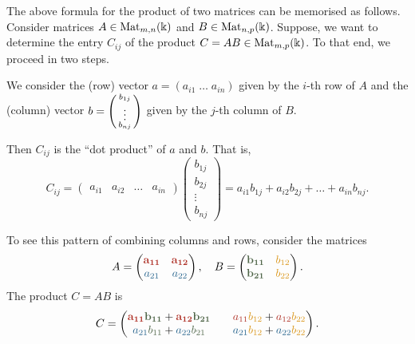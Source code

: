 \documentclass[a4paper, oneside, 12pt]{amsart}
\begin{document}
The above formula for the product of two matrices can be memorised as follows.
Consider matrices \(A\in \operatorname{Mat}_{m,n}(\Bbbk)\) and \(B \in \operatorname{Mat}_{n,p}( \Bbbk)\).
Suppose, we want to determine the entry \(C_{ij}\) of the product \(C= AB \in \operatorname{Mat}_{m,p} (\Bbbk)\).
To that end, we proceed in two steps.
\begin{thmlist}
  \item We consider the (row)  vector \(a= (a_{i1}\;  \dots \; a_{in})\) given by the \(i\)-th row of \(A\) and the (column) vector \(b = \begin{psmallmatrix} b_{1j}\\ \vdots \\b_{nj}  \end{psmallmatrix}
  \) given by the \(j\)-th column of \(B\).
  \item Then \( C_{ij} \) is the ``dot product'' of \( a \) and \( b \).
  That is,
  \begin{equation*}
    C_{ij}=
    \begin{pmatrix}
      a_{i1} & a_{i2} & \dots & a_{in}
    \end{pmatrix}
    \begin{pmatrix}
      b_{1j} \\
      b_{2j} \\
      \vdots \\
      b_{nj}
    \end{pmatrix}
    =
    a_{i1}b_{1j} + a_{i2} b_{2j} + \dots + a_{in}b_{nj}.
  \end{equation*}
\end{thmlist}
To see this pattern of combining columns and rows, consider the matrices
\begin{equation*}
  A = \begin{pmatrix}
    {\color{red}{\mathbf{a_{11}}}} & {\color{red}{\mathbf{a_{12}}}} \\
    {\color{dark blue}{a_{21}}} & {\color{dark blue}{a_{22}}}
  \end{pmatrix}, \quad
  B = \begin{pmatrix}
    {\color{dark green}{\mathbf{b_{11}}}} & {\color{pastel orange}{b_{12}}} \\
    {\color{dark green}{\mathbf{b_{21}}}} & {\color{pastel orange}{b_{22}}}
  \end{pmatrix}.
\end{equation*}
The product \( C = AB \) is
\begin{equation*}
  C =
  \begin{pmatrix}
    {\color{red}{\mathbf{a_{11}}}}{\color{dark green}{\mathbf{b_{11}}}} + {\color{red}{\mathbf{a_{12}}}}{\color{dark green}{\mathbf{b_{21}}}} & & {\color{red}{a_{11}}}{\color{pastel orange}{b_{12}}} + {\color{red}{a_{12}}}{\color{pastel orange}{b_{22}}} \\
    {\color{dark blue}{a_{21}}}{\color{dark green}{b_{11}}} + {\color{dark blue}{a_{22}}}{\color{dark green}{b_{21}}} & & {\color{dark blue}{a_{21}}}{\color{pastel orange}{b_{12}}} + {\color{dark blue}{a_{22}}}{\color{pastel orange}{b_{22}}}
  \end{pmatrix}.
\end{equation*}
\end{document}
